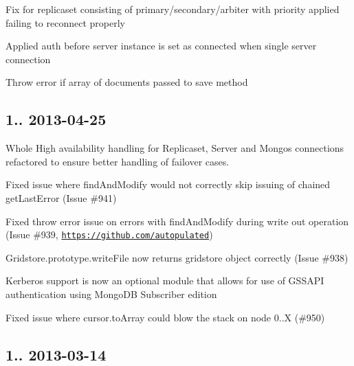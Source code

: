 \begin{DoxyItemize}
\item Fix for replicaset consisting of primary/secondary/arbiter with priority applied failing to reconnect properly
\item Applied auth before server instance is set as connected when single server connection
\item Throw error if array of documents passed to save method
\end{DoxyItemize}

\subsection*{1.. 2013-\/04-\/25 }


\begin{DoxyItemize}
\item Whole High availability handling for Replicaset, Server and Mongos connections refactored to ensure better handling of failover cases.
\item Fixed issue where find\+And\+Modify would not correctly skip issuing of chained get\+Last\+Error (Issue \#941)
\item Fixed throw error issue on errors with find\+And\+Modify during write out operation (Issue \#939, \href{https://github.com/autopulated}{\tt https\+://github.\+com/autopulated})
\item Gridstore.\+prototype.\+write\+File now returns gridstore object correctly (Issue \#938)
\item Kerberos support is now an optional module that allows for use of G\+S\+S\+A\+PI authentication using Mongo\+DB Subscriber edition
\item Fixed issue where cursor.\+to\+Array could blow the stack on node 0..\+X (\#950)
\end{DoxyItemize}

\subsection*{1.. 2013-\/03-\/14 }


